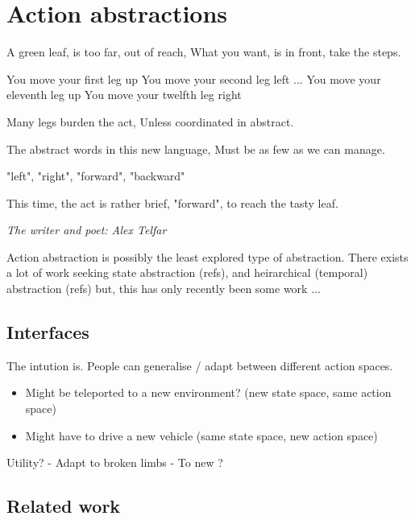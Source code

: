 \newpage
\section{Action abstractions}


\epigraph{
A green leaf, is too far, out of reach,
What you want, is in front, take the steps.

You move your first leg up You move your second leg left ... You move your eleventh leg up You move your twelfth leg right

Many legs burden the act,
Unless coordinated in abstract.

The abstract words in this new language,
Must be as few as we can manage.

"left", "right", "forward", "backward"

This time, the act is rather brief,
"forward", to reach the tasty leaf.
}{\textit{The writer and poet: Alex Telfar}}


Action abstraction is possibly the least explored type of abstraction.
There exists a lot of work seeking state abstraction (refs), and heirarchical (temporal) abstraction (refs)
but, this has only recently been some work ...

\subsection{Interfaces}

The intution is.
People can generalise / adapt between different action spaces.

\begin{itemize}
\tightlist
\item
  Might be teleported to a new environment? (new state space, same
  action space)
\item
  Might have to drive a new vehicle (same state space, new action space)
\end{itemize}


Utility?
- Adapt to broken limbs
- To new ?






\subsection{Related work}

\cite{Nagabandi2019}
